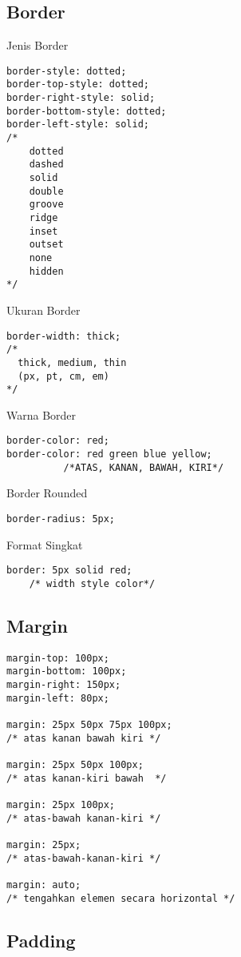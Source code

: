 \documentclass[12pt,a4paper]{article}
\begin{document}
\subsection*{Border}

Jenis Border
\begin{lstlisting}
border-style: dotted;
border-top-style: dotted;
border-right-style: solid;
border-bottom-style: dotted;
border-left-style: solid;
/*
    dotted
    dashed
    solid 
    double
    groove
    ridge 
    inset 
    outset
    none
    hidden
*/
\end{lstlisting}

Ukuran Border
\begin{lstlisting}
border-width: thick;
/*
  thick, medium, thin
  (px, pt, cm, em)
*/
\end{lstlisting}

Warna Border
\begin{lstlisting}
border-color: red; 
border-color: red green blue yellow;
          /*ATAS, KANAN, BAWAH, KIRI*/
\end{lstlisting}

Border Rounded
\begin{lstlisting}
border-radius: 5px;
\end{lstlisting}

Format Singkat
\begin{lstlisting}
border: 5px solid red;
    /* width style color*/
\end{lstlisting}

\subsection*{Margin}

\begin{lstlisting}
margin-top: 100px;
margin-bottom: 100px;
margin-right: 150px;
margin-left: 80px;

margin: 25px 50px 75px 100px;
/* atas kanan bawah kiri */

margin: 25px 50px 100px;
/* atas kanan-kiri bawah  */

margin: 25px 100px;
/* atas-bawah kanan-kiri */

margin: 25px;
/* atas-bawah-kanan-kiri */

margin: auto;
/* tengahkan elemen secara horizontal */
\end{lstlisting}

\subsection*{Padding}
\end{document}
